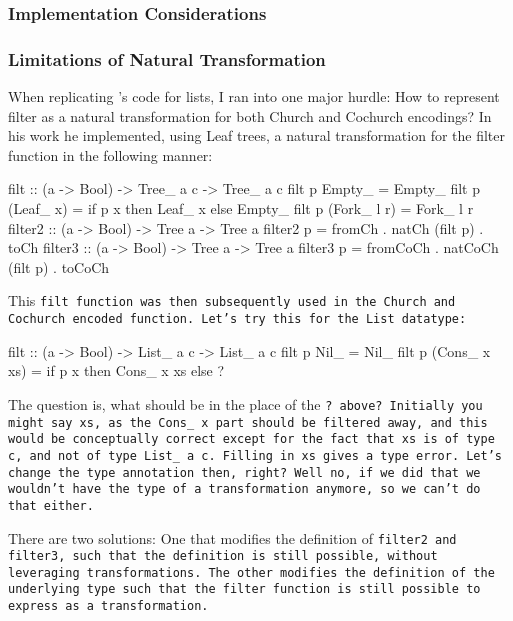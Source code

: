 \subsubsection{Implementation Considerations}
\subsubsection{Limitations of Natural Transformation}
When replicating \cite{Harper2011}'s code for lists, I ran into one major hurdle:
How to represent filter as a natural transformation for both Church and Cochurch encodings?
In his work he implemented, using Leaf trees, a natural transformation for the filter function in the following manner:
\begin{code}
filt :: (a -> Bool) -> Tree_ a c -> Tree_ a c
filt p Empty_ = Empty_
filt p (Leaf_ x) = if p x then Leaf_ x else Empty_
filt p (Fork_ l r) = Fork_ l r
filter2 :: (a -> Bool) -> Tree a -> Tree a
filter2 p = fromCh . natCh (filt p) . toCh
filter3 :: (a -> Bool) -> Tree a -> Tree a
filter3 p = fromCoCh . natCoCh (filt p) . toCoCh
\end{code}
This \tt{filt} function was then subsequently used in the Church and Cochurch encoded function.
Let's try this for the \tt{List} datatype:
\begin{code}
filt :: (a -> Bool) -> List_ a c -> List_ a c
filt p Nil_ = Nil_
filt p (Cons_ x xs) = if p x then Cons_ x xs else ? 
\end{code}
The question is, what should be in the place of the \tt{?} above?
Initially you might say \tt{xs}, as the \tt{Cons\_ x} part should be filtered away, and this would be conceptually correct except for the fact that \tt{xs} is of type \tt{c}, and not of type \tt{List\_ a c}.
Filling in \tt{xs} gives a type error.
Let's change the type annotation then, right?
Well no, if we did that we wouldn't have the type of a transformation anymore, so we can't do that either.

There are two solutions:
One that modifies the definition of \tt{filter2} and \tt{filter3}, such that the definition is still possible, without leveraging transformations.
The other modifies the definition of the underlying type such that the filter function is still possible to express as a transformation.
    
